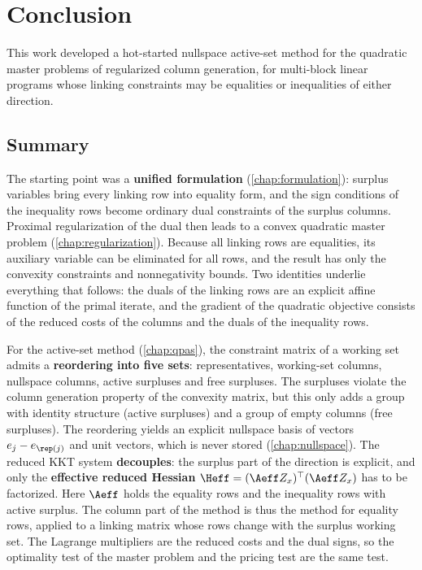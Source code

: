 \chapter{Conclusion}
\label{chap:conclusion}

This work developed a hot-started nullspace active-set method for the quadratic master
problems of regularized column generation, for multi-block linear programs whose linking
constraints may be equalities or inequalities of either direction.

\section{Summary}

The starting point was a \textbf{unified formulation} (\cref{chap:formulation}): surplus
variables bring every linking row into equality form, and the sign conditions of the
inequality rows become ordinary dual constraints of the surplus columns. Proximal
regularization of the dual then leads to a convex quadratic master problem
(\cref{chap:regularization}). Because all linking rows are equalities, its auxiliary variable
can be eliminated for all rows, and the result has only the convexity constraints and
nonnegativity bounds. Two identities underlie everything that follows: the duals of the
linking rows are an explicit affine function of the primal iterate, and the gradient of the
quadratic objective consists of the reduced costs of the columns and the duals of the
inequality rows.

\medskip

For the active-set method (\cref{chap:qpas}), the constraint matrix of a working set admits a
\textbf{reordering into five sets}: representatives, working-set columns, nullspace columns,
active surpluses and free surpluses. The surpluses violate the column generation property of
the convexity matrix, but this only adds a group with identity structure (active surpluses)
and a group of empty columns (free surpluses). The
reordering yields an explicit nullspace basis of vectors $e_j - e_{\rep(j)}$ and unit vectors,
which is never stored (\cref{chap:nullspace}). The reduced KKT system \textbf{decouples}: the
surplus part of the direction is explicit, and only the \textbf{effective reduced Hessian}
$\Heff = (\Aeff Z_x)^\top(\Aeff Z_x)$ has to be factorized. Here $\Aeff$ holds the equality rows
and the inequality rows with active surplus. The column part of the method is thus the method
for equality rows, applied to a linking matrix whose rows change with the surplus working set.
The Lagrange multipliers are the reduced costs and the dual signs, so the optimality test of
the master problem and the pricing test are the same test.

